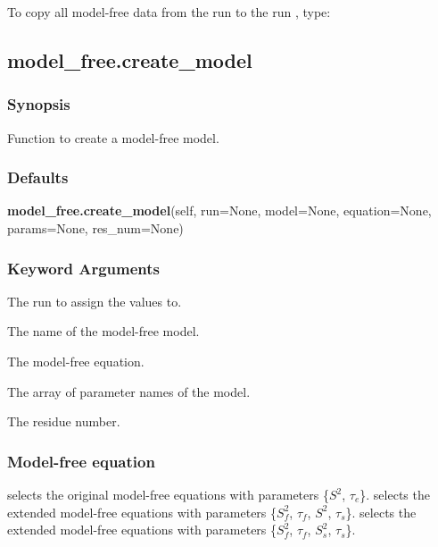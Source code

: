 To copy all model-free data from the run  to the run , type:






\newpage

\subsection{model\_free.create\_model}


\subsubsection{Synopsis}

Function to create a model-free model.



\subsubsection{Defaults}

\textsf{\textbf{model\_free.create\_model}(self, run=None, model=None, equation=None, params=None, res\_num=None)}


\subsubsection{Keyword Arguments}

  The run to assign the values to. 

  The name of the model-free model. 

  The model-free equation. 

  The array of parameter names of the model. 

  The residue number. 




\subsubsection{Model-free equation}

 selects the original model-free equations with parameters \{$S^2$, $\tau_e$\}.  selects the extended model-free equations with parameters \{$S^2_f$, $\tau_f$, $S^2$, $\tau_s$\}.  selects the extended model-free equations with parameters \{$S^2_f$, $\tau_f$, $S^2_s$, $\tau_s$\}.



